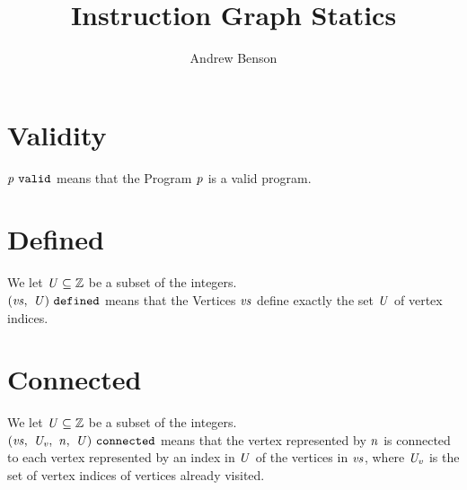 \documentclass[12pt]{article}
\title{Instruction Graph Statics}
\author{Andrew Benson}
\date{}
\begin{document}
\maketitle

\thispagestyle{simple}

\section{Validity}

$\valid{\nterm{p}}$ means that the Program $\nterm{p}$ is a valid program.

\begin{mathpar}
\end{mathpar}

\section{Defined}

We let $\nterm{U} \subseteq \mathbb{Z}$ be a subset of the integers.\\

$\defined{\nterm{vs}}{\nterm{U}}$ means that the Vertices $\nterm{vs}$ define
exactly the set $\nterm{U}$ of vertex indices.

\begin{mathpar}

\end{mathpar}

\section{Connected}

We let $\nterm{U} \subseteq \mathbb{Z}$ be a subset of the integers.\\

$\connected{\nterm{vs}}{\nterm{U_v}}{\nterm{n}}{\nterm{U}}$ means that the
vertex represented by $\nterm{n}$ is connected to each vertex represented by an
index in $\nterm{U}$ of the vertices in $\nterm{vs}$, where $\nterm{U_v}$ is the
set of vertex indices of vertices already visited.
\end{document}
